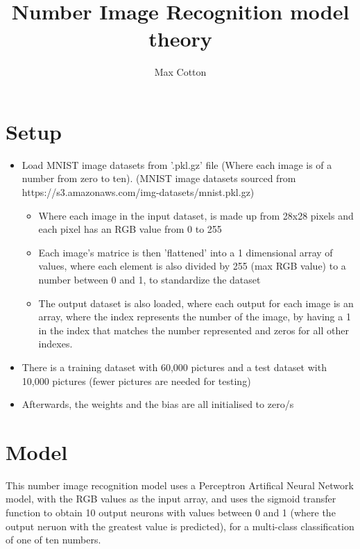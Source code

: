 \documentclass[10pt,a4paper]{article}
\title{Number Image Recognition model theory}
\author{Max Cotton}
\date{}
\begin{document}
\maketitle

\section{Setup}

\begin{itemize}
    \item Load MNIST image datasets from '.pkl.gz' file (Where each image is of a number from zero to ten). (MNIST image datasets sourced from https://s3.amazonaws.com/img-datasets/mnist.pkl.gz)
    \begin{itemize}
        \item Where each image in the input dataset, is made up from 28x28 pixels and each pixel has an RGB value from 0 to 255
        \item Each image's matrice is then 'flattened' into a 1 dimensional array of values, where each element is also divided by 255 (max RGB value) to a number between 0 and 1, to standardize the dataset
        \item The output dataset is also loaded, where each output for each image is an array, where the index represents the number of the image, by having a 1 in the index that matches the number represented and zeros for all other indexes.
    \end{itemize}
    \item There is a training dataset with 60,000 pictures and a test dataset with 10,000 pictures (fewer pictures are needed for testing)
    \item Afterwards, the weights and the bias are all initialised to zero/s
\end{itemize}

\section{Model}
This number image recognition model uses a Perceptron Artifical Neural Network model, with the RGB values as the input array, and uses the sigmoid transfer function to obtain 10 output neurons with values between 0 and 1 (where the output neruon with the greatest value is predicted), for a multi-class classification of one of ten numbers.
\end{document}
